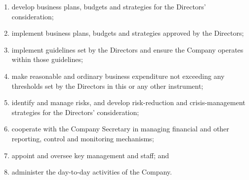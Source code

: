 \documentclass[a4paper,10pt]{article}
\renewcommand{\labelenumi}{(\arabic{enumi})}
\begin{document}
\begin{enumerate}
    \renewcommand{\labelenumi}{(\alph{enumi})}
    \item develop business plans, budgets and strategies for the Directors' consideration;
    \item implement business plans, budgets and strategies approved by the Directors;
    \item implement guidelines set by the Directors and ensure the Company operates within those guidelines;
    \item make reasonable and ordinary business expenditure not exceeding any thresholds set by the Directors in this or any other instrument;
    \item identify and manage risks, and develop risk-reduction and crisis-management strategies for the Directors' consideration;
    \item cooperate with the Company Secretary in managing financial and other reporting, control and monitoring mechanisms;
    \item appoint and oversee key management and staff; and
    \item administer the day-to-day activities of the Company.
\end{enumerate}
\end{document}
